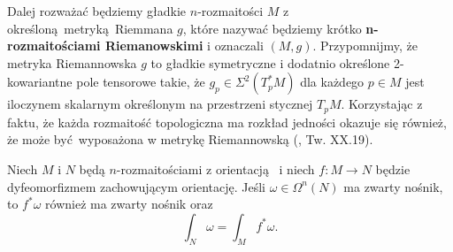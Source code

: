 
%


Dalej rozważać będziemy gładkie \(n\)-rozmaitości \(M\) z określoną metryką Riemmana \(g\), które nazywać będziemy krótko \textbf{n-rozmaitościami Riemanowskimi} i oznaczali \((M, g)\). Przypomnijmy, że metryka Riemannowska \(g\) to gładkie symetryczne i dodatnio określone 2-kowariantne pole tensorowe takie, że \(g_p \in \Sigma^2(T^{\ast}_p M)\) dla każdego \(p\in M\) jest iloczynem skalarnym określonym na przestrzeni stycznej \(T_p M\). Korzystając z faktu, że każda rozmaitość topologiczna ma rozkład jedności okazuje się również, że może być wyposażona w metrykę Riemannowską (\cite{maurin2}, Tw. XX.19).

\begin{twierdzenie}\label{thm:coord_change}
    Niech \(M\) i \(N\) będą \(n\)-rozmaitościami z orientacją  i niech \(f: M\to N\) będzie dyfeomorfizmem zachowującym orientację. Jeśli \(\omega \in \Omega^n(N)\) ma zwarty nośnik, to \(f^\ast\omega\) również ma zwarty nośnik oraz
    \begin{equation}\label{eq:zamiana zmiennych}
        \int_N \omega = \int_M f^\ast \omega.
    \end{equation}
\end{twierdzenie}

